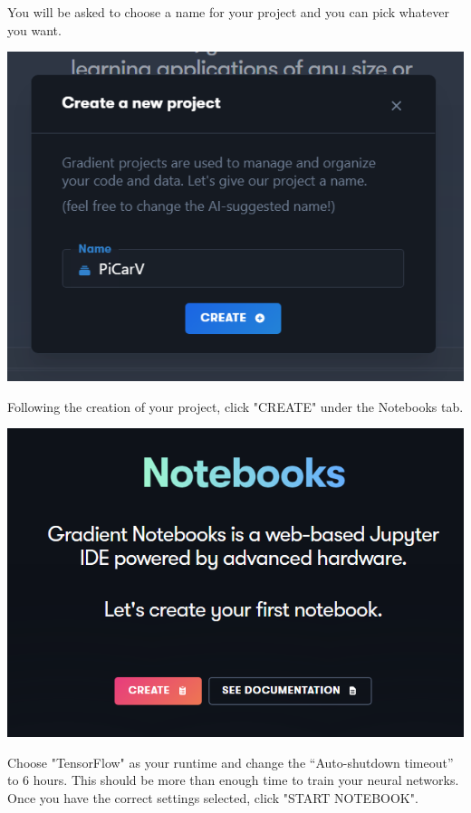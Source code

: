 \documentclass[11pt]{report}
\begin{document}
You will be asked to choose a name for your project and you can pick whatever you want.

\begin{center}
    \includegraphics[scale=0.6]{nameproject.png}
\end{center}

Following the creation of your project, click "CREATE" under the Notebooks tab.

\begin{center}
    \includegraphics[scale=0.5]{notebook.png}
\end{center}

Choose "TensorFlow" as your runtime and change the “Auto-shutdown timeout” to 6 hours. This should be more than enough time to train your neural networks. Once you have the correct settings selected, click "START NOTEBOOK".
\end{document}
